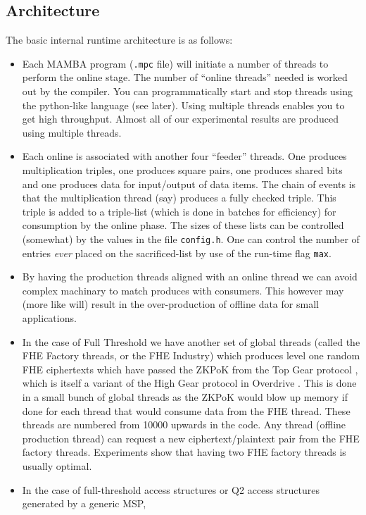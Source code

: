 \subsection{Architecture}
The basic internal runtime architecture is as follows:
\begin{itemize}
\item Each MAMBA program (\verb+.mpc+ file) will initiate a number of threads
to perform the online stage.
The number of ``online threads'' needed is worked out by the compiler. You
can programmatically start and stop threads using the python-like
language (see later).
Using multiple threads enables you to get high throughput. Almost all
of our experimental results are produced using multiple threads.
\item Each online is associated with another four ``feeder'' threads.
One produces multiplication triples, one produces square pairs,
one produces shared bits and one produces data for input/output
of data items.
The chain of events is that the multiplication thread (say) produces
a fully checked triple. This triple is added to a triple-list (which is
done in batches for efficiency) for consumption by the online
phase.
The sizes of these lists can be controlled (somewhat) by the
values in the file \verb+config.h+.
One can control the number of entries {\em ever}
placed on the sacrificed-list by use of the run-time flag \verb+max+.
\item By having the production threads aligned with an online
thread we can avoid complex machinary to match produces with
consumers. This however may (more like will) result in the 
over-production of offline data for small applications.
\item In the case of Full Threshold we have another set of global
threads (called the FHE Factory threads, or the FHE Industry) 
which produces level one random FHE ciphertexts which have passed 
the ZKPoK from the Top Gear protocol \cite{TopGear},
which is itself a variant of the High Gear protocol in Overdrive \cite{KPR}.
This is done in a small bunch of global threads as the ZKPoK would
blow up memory if done for each thread that would consume 
data from the FHE thread.
These threads are numbered from 10000 upwards in the code.
Any thread (offline production thread) can request a new
ciphertext/plaintext pair from the FHE factory threads.
Experiments show that having two FHE factory threads is usually
optimal.
\item In the case of full-threshold access structures or 
	Q2 access structures generated by a generic MSP,

\end{itemize}
